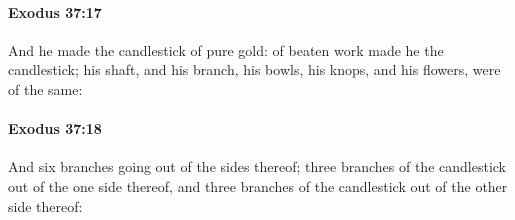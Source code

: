 		\paragraph{Exodus 37:17} %
			\label{EXODUS-37-17}

			And he made the candlestick of pure gold: of beaten work made he the candlestick; his shaft, and his branch, his bowls, his knops, and his flowers, were of the same:


		\paragraph{Exodus 37:18} %
			\label{EXODUS-37-18}

			And six branches going out of the sides thereof; three branches of the candlestick out of the one side thereof, and three branches of the candlestick out of the other side thereof:


